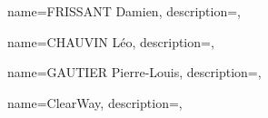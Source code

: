{
    name={FRISSANT Damien},
    description={},
}

{
    name={CHAUVIN Léo},
    description={},
}

{
    name={GAUTIER Pierre-Louis},
    description={},
}

{
    name={ClearWay},
    description={},
}
